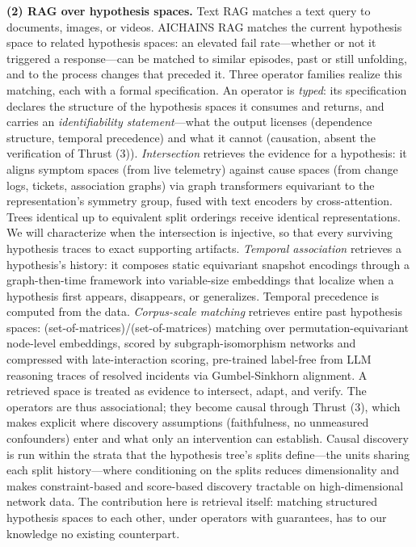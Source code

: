 \documentclass[12pt]{article}
\begin{document}
\textbf{(2) RAG over hypothesis spaces.} Text RAG matches a text query to documents, images, or videos. AICHAINS RAG matches the current hypothesis space to related hypothesis spaces: an elevated fail rate---whether or not it triggered a response---can be matched to similar episodes, past or still unfolding, and to the process changes that preceded it. Three operator families realize this matching, each with a formal specification. An operator is \emph{typed}: its specification declares the structure of the hypothesis spaces it consumes and returns, and carries an \emph{identifiability statement}---what the output licenses (dependence structure, temporal precedence) and what it cannot (causation, absent the verification of Thrust (3)). \emph{Intersection} retrieves the evidence for a hypothesis: it aligns symptom spaces (from live telemetry) against cause spaces (from change logs, tickets, association graphs) via graph transformers equivariant to the representation's symmetry group, fused with text encoders by cross-attention. Trees identical up to equivalent split orderings receive identical representations. We will characterize when the intersection is injective, so that every surviving hypothesis traces to exact supporting artifacts. \emph{Temporal association} retrieves a hypothesis's history: it composes static equivariant snapshot encodings through a graph-then-time framework into variable-size embeddings that localize when a hypothesis first appears, disappears, or generalizes. Temporal precedence is computed from the data. \emph{Corpus-scale matching} retrieves entire past hypothesis spaces: (set-of-matrices)/(set-of-matrices) matching over permutation-equivariant node-level embeddings, scored by subgraph-isomorphism networks and compressed with late-interaction scoring, pre-trained label-free from LLM reasoning traces of resolved incidents via Gumbel-Sinkhorn alignment. A retrieved space is treated as evidence to intersect, adapt, and verify. The operators are thus associational; they become causal through Thrust (3), which makes explicit where discovery assumptions (faithfulness, no unmeasured confounders) enter and what only an intervention can establish. Causal discovery is run within the strata that the hypothesis tree's splits define---the units sharing each split history---where conditioning on the splits reduces dimensionality and makes constraint-based and score-based discovery tractable on high-dimensional network data. The contribution here is retrieval itself: matching structured hypothesis spaces to each other, under operators with guarantees, has to our knowledge no existing counterpart.
\end{document}
